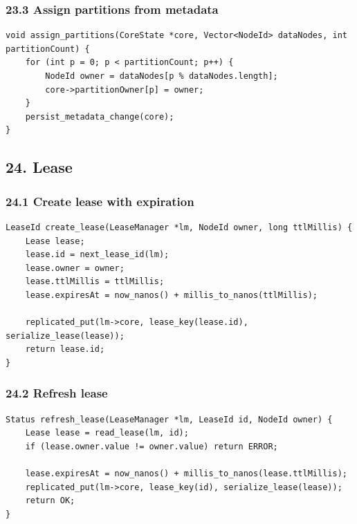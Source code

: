 \documentclass[10pt,letterpaper]{article}
\begin{document}
\subsubsection*{23.3 Assign partitions from metadata}

\begin{verbatim}
void assign_partitions(CoreState *core, Vector<NodeId> dataNodes, int partitionCount) {
    for (int p = 0; p < partitionCount; p++) {
        NodeId owner = dataNodes[p % dataNodes.length];
        core->partitionOwner[p] = owner;
    }
    persist_metadata_change(core);
}
\end{verbatim}

\subsection*{24. Lease}

\subsubsection*{24.1 Create lease with expiration}

\begin{verbatim}
LeaseId create_lease(LeaseManager *lm, NodeId owner, long ttlMillis) {
    Lease lease;
    lease.id = next_lease_id(lm);
    lease.owner = owner;
    lease.ttlMillis = ttlMillis;
    lease.expiresAt = now_nanos() + millis_to_nanos(ttlMillis);

    replicated_put(lm->core, lease_key(lease.id), serialize_lease(lease));
    return lease.id;
}
\end{verbatim}

\subsubsection*{24.2 Refresh lease}

\begin{verbatim}
Status refresh_lease(LeaseManager *lm, LeaseId id, NodeId owner) {
    Lease lease = read_lease(lm, id);
    if (lease.owner.value != owner.value) return ERROR;

    lease.expiresAt = now_nanos() + millis_to_nanos(lease.ttlMillis);
    replicated_put(lm->core, lease_key(id), serialize_lease(lease));
    return OK;
}
\end{verbatim}
\end{document}
